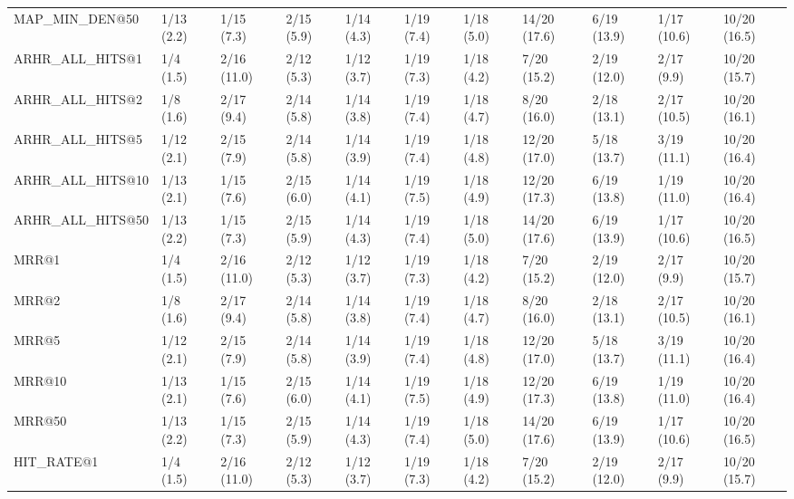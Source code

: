 \begin{tabular}{lllllllllll}
MAP_MIN_DEN@50              &     1/13 (2.2) &     1/15 (7.3) &    2/15 (5.9) &    1/14 (4.3) &  1/19 (7.4) &   1/18 (5.0) &   14/20 (17.6) &         6/19 (13.9) &  1/17 (10.6) &  10/20 (16.5) \\
ARHR_ALL_HITS@1             &      1/4 (1.5) &    2/16 (11.0) &    2/12 (5.3) &    1/12 (3.7) &  1/19 (7.3) &   1/18 (4.2) &    7/20 (15.2) &         2/19 (12.0) &   2/17 (9.9) &  10/20 (15.7) \\
ARHR_ALL_HITS@2             &      1/8 (1.6) &     2/17 (9.4) &    2/14 (5.8) &    1/14 (3.8) &  1/19 (7.4) &   1/18 (4.7) &    8/20 (16.0) &         2/18 (13.1) &  2/17 (10.5) &  10/20 (16.1) \\
ARHR_ALL_HITS@5             &     1/12 (2.1) &     2/15 (7.9) &    2/14 (5.8) &    1/14 (3.9) &  1/19 (7.4) &   1/18 (4.8) &   12/20 (17.0) &         5/18 (13.7) &  3/19 (11.1) &  10/20 (16.4) \\
ARHR_ALL_HITS@10            &     1/13 (2.1) &     1/15 (7.6) &    2/15 (6.0) &    1/14 (4.1) &  1/19 (7.5) &   1/18 (4.9) &   12/20 (17.3) &         6/19 (13.8) &  1/19 (11.0) &  10/20 (16.4) \\
ARHR_ALL_HITS@50            &     1/13 (2.2) &     1/15 (7.3) &    2/15 (5.9) &    1/14 (4.3) &  1/19 (7.4) &   1/18 (5.0) &   14/20 (17.6) &         6/19 (13.9) &  1/17 (10.6) &  10/20 (16.5) \\
MRR@1                       &      1/4 (1.5) &    2/16 (11.0) &    2/12 (5.3) &    1/12 (3.7) &  1/19 (7.3) &   1/18 (4.2) &    7/20 (15.2) &         2/19 (12.0) &   2/17 (9.9) &  10/20 (15.7) \\
MRR@2                       &      1/8 (1.6) &     2/17 (9.4) &    2/14 (5.8) &    1/14 (3.8) &  1/19 (7.4) &   1/18 (4.7) &    8/20 (16.0) &         2/18 (13.1) &  2/17 (10.5) &  10/20 (16.1) \\
MRR@5                       &     1/12 (2.1) &     2/15 (7.9) &    2/14 (5.8) &    1/14 (3.9) &  1/19 (7.4) &   1/18 (4.8) &   12/20 (17.0) &         5/18 (13.7) &  3/19 (11.1) &  10/20 (16.4) \\
MRR@10                      &     1/13 (2.1) &     1/15 (7.6) &    2/15 (6.0) &    1/14 (4.1) &  1/19 (7.5) &   1/18 (4.9) &   12/20 (17.3) &         6/19 (13.8) &  1/19 (11.0) &  10/20 (16.4) \\
MRR@50                      &     1/13 (2.2) &     1/15 (7.3) &    2/15 (5.9) &    1/14 (4.3) &  1/19 (7.4) &   1/18 (5.0) &   14/20 (17.6) &         6/19 (13.9) &  1/17 (10.6) &  10/20 (16.5) \\
HIT_RATE@1                  &      1/4 (1.5) &    2/16 (11.0) &    2/12 (5.3) &    1/12 (3.7) &  1/19 (7.3) &   1/18 (4.2) &    7/20 (15.2) &         2/19 (12.0) &   2/17 (9.9) &  10/20 (15.7) \\

\end{tabular}

